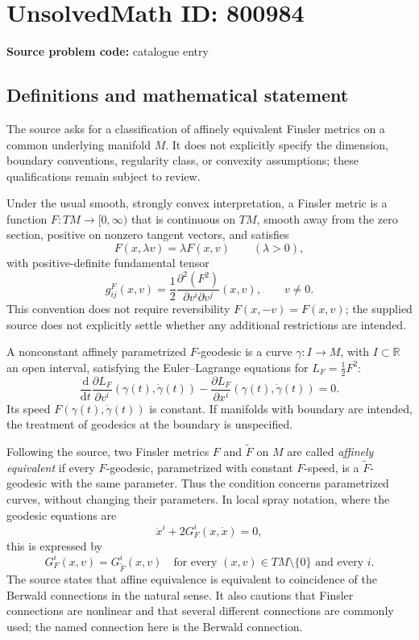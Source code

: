\documentclass[11pt]{article}
\newcommand{\R}{\mathbb{R}}
\begin{document}
\section*{UnsolvedMath ID: 800984}
\textbf{Source problem code:} catalogue entry
\subsection{Definitions and mathematical statement}
The source asks for a classification of affinely equivalent Finsler metrics on a common underlying manifold \(M\). It does not explicitly specify the dimension, boundary conventions, regularity class, or convexity assumptions; these qualifications remain subject to review.

Under the usual smooth, strongly convex interpretation, a Finsler metric is a function \(F:TM\to[0,\infty)\) that is continuous on \(TM\), smooth away from the zero section, positive on nonzero tangent vectors, and satisfies
\[
F(x,\lambda v)=\lambda F(x,v)\qquad(\lambda>0),
\]
with positive-definite fundamental tensor
\[
g^F_{ij}(x,v)=\frac12\frac{\partial^2(F^2)}{\partial v^i\partial v^j}(x,v),\qquad v\ne0.
\]
This convention does not require reversibility \(F(x,-v)=F(x,v)\); the supplied source does not explicitly settle whether any additional restrictions are intended.

A nonconstant affinely parametrized \(F\)-geodesic is a curve \(\gamma:I\to M\), with \(I\subset\R\) an open interval, satisfying the Euler--Lagrange equations for \(L_F=\tfrac12F^2\):
\[
\frac{\mathrm d}{\mathrm dt}\frac{\partial L_F}{\partial v^i}(\gamma(t),\dot\gamma(t))
-\frac{\partial L_F}{\partial x^i}(\gamma(t),\dot\gamma(t))=0.
\]
Its speed \(F(\gamma(t),\dot\gamma(t))\) is constant. If manifolds with boundary are intended, the treatment of geodesics at the boundary is unspecified.

Following the source, two Finsler metrics \(F\) and \(\widetilde F\) on \(M\) are called \emph{affinely equivalent} if every \(F\)-geodesic, parametrized with constant \(F\)-speed, is a \(\widetilde F\)-geodesic with the same parameter. Thus the condition concerns parametrized curves, without changing their parameters. In local spray notation, where the geodesic equations are
\[
\ddot x^i+2G_F^i(x,\dot x)=0,
\]
this is expressed by
\[
G_F^i(x,v)=G_{\widetilde F}^i(x,v)
\quad\text{for every }(x,v)\in TM\setminus\{0\}\text{ and every }i.
\]
The source states that affine equivalence is equivalent to coincidence of the Berwald connections in the natural sense. It also cautions that Finsler connections are nonlinear and that several different connections are commonly used; the named connection here is the Berwald connection.
\end{document}

